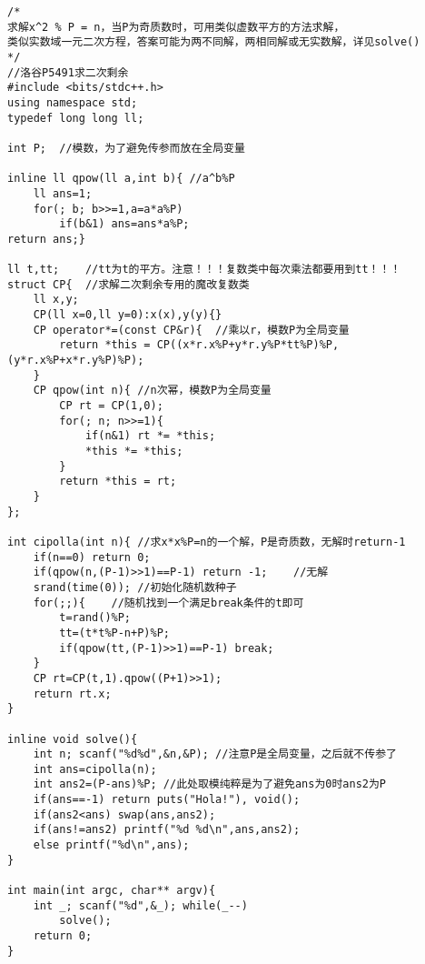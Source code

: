 \begin{lstlisting}
/*
求解x^2 % P = n，当P为奇质数时，可用类似虚数平方的方法求解，
类似实数域一元二次方程，答案可能为两不同解，两相同解或无实数解，详见solve()
*/
//洛谷P5491求二次剩余
#include <bits/stdc++.h>
using namespace std;
typedef long long ll;

int P;	//模数，为了避免传参而放在全局变量

inline ll qpow(ll a,int b){	//a^b%P
	ll ans=1;
	for(; b; b>>=1,a=a*a%P)
		if(b&1) ans=ans*a%P;
return ans;}

ll t,tt;	//tt为t的平方。注意！！！复数类中每次乘法都要用到tt！！！
struct CP{	//求解二次剩余专用的魔改复数类 
	ll x,y;
	CP(ll x=0,ll y=0):x(x),y(y){}
	CP operator*=(const CP&r){	//乘以r，模数P为全局变量
		return *this = CP((x*r.x%P+y*r.y%P*tt%P)%P,(y*r.x%P+x*r.y%P)%P);
	}
	CP qpow(int n){	//n次幂，模数P为全局变量
		CP rt = CP(1,0);
		for(; n; n>>=1){
			if(n&1) rt *= *this;
			*this *= *this;
		}
		return *this = rt;
	}
};

int cipolla(int n){	//求x*x%P=n的一个解，P是奇质数，无解时return-1
	if(n==0) return 0; 
	if(qpow(n,(P-1)>>1)==P-1) return -1;	//无解
	srand(time(0));	//初始化随机数种子
	for(;;){	//随机找到一个满足break条件的t即可 
		t=rand()%P;
		tt=(t*t%P-n+P)%P;
		if(qpow(tt,(P-1)>>1)==P-1) break;
	}
	CP rt=CP(t,1).qpow((P+1)>>1);
	return rt.x;
}

inline void solve(){
	int n; scanf("%d%d",&n,&P);	//注意P是全局变量，之后就不传参了 
	int ans=cipolla(n);
	int ans2=(P-ans)%P;	//此处取模纯粹是为了避免ans为0时ans2为P
	if(ans==-1) return puts("Hola!"), void(); 
	if(ans2<ans) swap(ans,ans2);
	if(ans!=ans2) printf("%d %d\n",ans,ans2);
	else printf("%d\n",ans);
}

int main(int argc, char** argv){
	int _; scanf("%d",&_); while(_--)
		solve();
	return 0;
}
\end{lstlisting}
